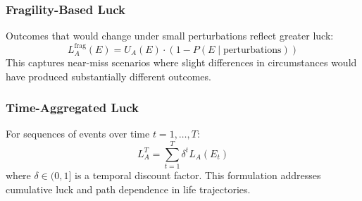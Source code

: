   \subsubsection{Fragility-Based Luck}

  Outcomes that would change under small perturbations reflect greater
  luck:
  \begin{equation}
    L_{A}^{\text{frag}}(E) = U_{A}(E) \cdot \left(1 - P(E \mid \text{perturbations}
    )\right)
  \end{equation}
  This captures near-miss scenarios where slight differences in circumstances
  would have produced substantially different outcomes.

  \subsubsection{Time-Aggregated Luck}

  For sequences of events over time $t = 1, \ldots, T$:
  \begin{equation}
    L_{A}^{T}= \sum_{t=1}^{T}\delta^{t} L_{A}(E_{t})
  \end{equation}
  where $\delta \in (0,1]$ is a temporal discount factor. This
  formulation addresses cumulative luck and path dependence in life
  trajectories.

